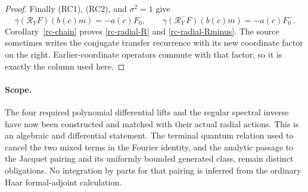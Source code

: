 \begin{proof}
Finally (RC1), (RC2), and $\sigma^2=1$ give
\[
 \gamma(\mathcal R_YF)(b(c)m)
       =-\overline{a(c)}F_0,\qquad
 \gamma(\mathcal R_Y^-F)(b(c)m)
       =-a(c)F_0^- .
 \]
Corollary~\ref{rc-chain} proves
\eqref{rc-radial-R} and
\eqref{rc-radial-Rminus}.
The source sometimes writes the conjugate
transfer recurrence with its new coordinate
factor on the right.  Earlier-coordinate
operators commute with that factor, so it
is exactly the column used here.
\end{proof}

\paragraph{Scope.}
The four required polynomial differential
lifts and the regular spectral inverse have
now been constructed and matched with their
actual radial actions.  This is an algebraic
and differential statement.  The terminal
quantum relation used to cancel the two
mixed terms in the Fourier identity, and
the analytic passage to the Jacquet pairing
and its uniformly bounded generated class,
remain distinct obligations.  No integration
by parts for that pairing is inferred from
the ordinary Haar formal-adjoint calculation.


